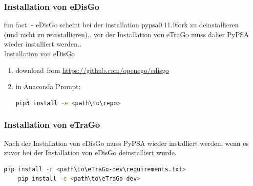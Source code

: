 \documentclass[
a4paper,     %
12pt         %
]{scrartcl}  %
\begin{document}
\subsubsection{Installation von eDisGo}
fun fact: - eDisGo scheint bei der installation pypsa0.11.0fork zu deinstallieren (und nicht zu reinstallieren).. vor der Installation von eTraGo muss daher PyPSA wieder installiert werden..\\

Installation von eDisGo
\begin{enumerate}
	\item download from \url{https://github.com/openego/edisgo}\\
	\item in Anaconda Prompt:
	\begin{lstlisting}[language=bash]
		pip3 install -e <path\to\repo>
	\end{lstlisting}
\end{enumerate}

\subsubsection{Installation von eTraGo}
Nach der Installation von eDisGo muss PyPSA wieder installiert werden, wenn es zuvor bei der Installation von eDisGo deinstalliert wurde.
\begin{lstlisting}[language=bash]
	pip install -r <path\to\eTraGo-dev\requirements.txt>
	pip install -e <path\to\eTraGo-dev>
\end{lstlisting}


\end{document}
